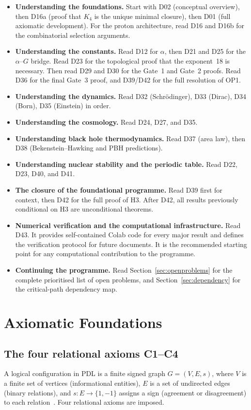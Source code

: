 \documentclass[11pt,a4paper]{article}
\theoremstyle{plain}
\theoremstyle{definition}
\theoremstyle{remark}
\begin{document}
\begin{itemize}
\item \textbf{Understanding the foundations.} Start with D02 (conceptual overview), then D16a (proof that $K_4$ is the unique minimal closure), then D01 (full axiomatic development). For the proton architecture, read D16 and D16b for the combinatorial selection arguments.
\item \textbf{Understanding the constants.} Read D12 for $\alpha$, then D21 and D25 for the $\alpha$--$G$ bridge. Read D23 for the topological proof that the exponent~18 is necessary. Then read D29 and D30 for the Gate~1 and Gate~2 proofs. Read D36 for the final Gate~3 proof, and D39/D42 for the full resolution of OP1.
\item \textbf{Understanding the dynamics.} Read D32 (Schr\"odinger), D33 (Dirac), D34 (Born), D35 (Einstein) in order.
\item \textbf{Understanding the cosmology.} Read D24, D27, and D35.
\item \textbf{Understanding black hole thermodynamics.} Read D37 (area law), then D38 (Bekenstein--Hawking and PBH predictions).
\item \textbf{Understanding nuclear stability and the periodic table.} Read D22, D23, D40, and D41.
\item \textbf{The closure of the foundational programme.} Read D39 first for context, then D42 for the full proof of H3. After D42, all results previously conditional on H3 are unconditional theorems.
\item \textbf{Numerical verification and the computational infrastructure.} Read D43. It provides self-contained Colab code for every major result and defines the verification protocol for future documents. It is the recommended starting point for any computational contribution to the programme.
\item \textbf{Continuing the programme.} Read Section~\ref{sec:openproblems} for the complete prioritised list of open problems, and Section~\ref{sec:dependency} for the critical-path dependency map.
\end{itemize}

\section{Axiomatic Foundations}
\label{sec:axioms}

\subsection{The four relational axioms C1--C4}
\label{subsec:axioms}
A logical configuration in PDL is a finite signed graph $G=(V,E,s)$, where $V$ is a finite set of vertices (informational entities), $E$ is a set of undirected edges (binary relations), and $s\colon E\to\{1,-1\}$ assigns a sign (agreement or disagreement) to each relation~\cite{D01,D02}. Four relational axioms are imposed.
\end{document}
